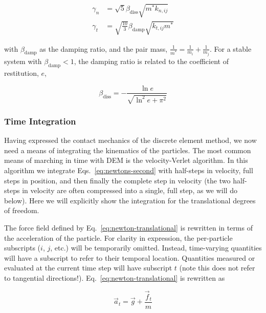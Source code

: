 \begin{subequations}
\begin{align}
	\gamma_n &= \sqrt{5}\beta_\text{diss}\sqrt{m^*k_{n,ij}} \\
	\gamma_t &= \sqrt{\frac{10}{3}}\beta_\text{damp}\sqrt{k_{t,ij} m^*}
\end{align}
\end{subequations}

with $\beta_\text{damp}$ as the damping ratio, and the pair mass, $\frac{1}{m^*} = \frac{1}{m_i} + \frac{1}{m_j}$. For a stable system with $\beta_\text{damp} < 1$, the damping ratio is related to the coefficient of restitution, $e$,

\begin{equation}
	\beta_\text{diss} = -\frac{\ln{e}}{\sqrt{\ln^2{e}+\pi^2}}
\end{equation}





\subsubsection{Time Integration}\label{sec:velocity-verlet}

Having expressed the contact mechanics of the discrete element method, we now need a means of integrating the kinematics of the particles. The most common means of marching in time with DEM is the velocity-Verlet algorithm\cite{Kruggel-Emden2008}. In this algorithm we integrate Eqs.~\ref{eq:newtons-second} with half-steps in velocity, full steps in position, and then finally the complete step in velocity (the two half-steps in velocity are often compressed into a single, full step, as we will do below). Here we will explicitly show the integration for the translational degrees of freedom. 

The force field defined by Eq.~\ref{eq:newton-translational} is rewritten in terms of the acceleration of the particle. For clarity in expression, the per-particle subscripts ($i$, $j$, etc.) will be temporarily omitted. Instead, time-varying quantities will have a subscript to refer to their temporal location. Quantities measured or evaluated at the current time step will have subscript $t$ (note this does not refer to tangential directions!). Eq.~\ref{eq:newton-translational} is rewritten as

\begin{equation}\label{eq:newton-acceleration}
	\vec{a}_t = \vec{g} + \frac{\vec{f}_t}{m}
\end{equation}

